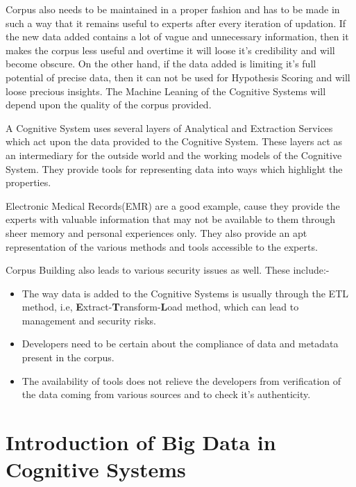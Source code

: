 Corpus also needs to be maintained in a proper fashion and has to be made in
such a way that it remains useful to experts after every iteration of updation.
If the new data added contains a lot of vague and unnecessary information, then
it makes the corpus less useful and overtime it will loose it's credibility and
will become obscure. On the other hand, if the data added is limiting it's full
potential of precise data, then it can not be used for Hypothesis Scoring and
will loose precious insights. The Machine Leaning of the Cognitive Systems will
depend upon the quality of the corpus provided.

A Cognitive System uses several layers of Analytical and Extraction Services
which act upon the data provided to the Cognitive System. These layers act as
an intermediary for the outside world and the working models of the Cognitive
System. They provide tools for representing data into ways which highlight the
properties.

Electronic Medical Records(EMR) are a good example, cause they provide the
experts with valuable information that may not be available to them through
sheer memory and personal experiences only. They also provide an apt
representation of the various methods and tools accessible to the experts.


Corpus Building also leads to various security issues as well. These include:-

\begin{itemize}
	\item The way data is added to the Cognitive Systems is usually through the ETL
	      method, i.e, \textbf{E}xtract-\textbf{T}ransform-\textbf{L}oad method, which
	      can lead to management and security risks.
\end{itemize}

\begin{itemize}
	\item Developers need to be certain about the compliance of data and metadata present
	      in the corpus.
\end{itemize}

\begin{itemize}
	\item The availability of tools does not relieve the developers from verification of
	      the data coming from various sources and to check it's authenticity.
\end{itemize}

\section{Introduction of Big Data in Cognitive Systems}\label{Big Data and Cognitive Systems}

